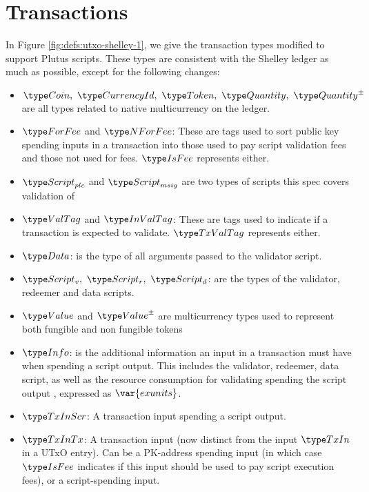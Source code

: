 \section{Transactions}
\label{sec:transactions}

In Figure \ref{fig:defs:utxo-shelley-1}, we give the transaction types modified
to support Plutus scripts. These types are consistent with the Shelley ledger
as much as possible,
except for the following changes:

\begin{itemize}
  \item $\Coin,~\CurrencyId,~\Token,~\Quantity,~\QuantityPM$ are all types
  related to native multicurrency on the ledger.

  \item $\ForFee$ and $\NForFee$: These are tags used to sort public key
  spending inputs in a transaction into those used to pay script validation
  fees and those not used
  for fees. $\IsFee$ represents either.

  \item $\ScriptPlutus$ and $\ScriptMSig$ are two types of scripts this spec
  covers validation of

  \item $\ValTag$ and $\InValTag$: These are tags used to indicate if a
  transaction is expected to validate.
  $\TxValTag$ represents either.

  \item $\Data$: is the type of all arguments passed to the validator script.

  \item $\ScriptV,~ \ScriptR,~ \ScriptD$: are the types of the validator,
  redeemer and data scripts.

  \item $\Value$ and $\ValuePM$ are multicurrency types used to represent
  both fungible and non fungible tokens

  \item $\Info$: is the additional information an input in a transaction must
  have when spending a script output. This includes the validator, redeemer,
  data script,
  as well as the resource consumption for validating spending the script output
  , expressed as $\var{exunits}$.

  \item $\TxInScr$: A transaction input spending a script output.

  \item $\TxInTx$: A transaction input (now distinct from the input $\TxIn$ in
  a UTxO entry). Can be a PK-address spending input
  (in which case $\IsFee$ indicates if this input should be used to pay script execution
  fees), or a script-spending input.


\end{itemize}
